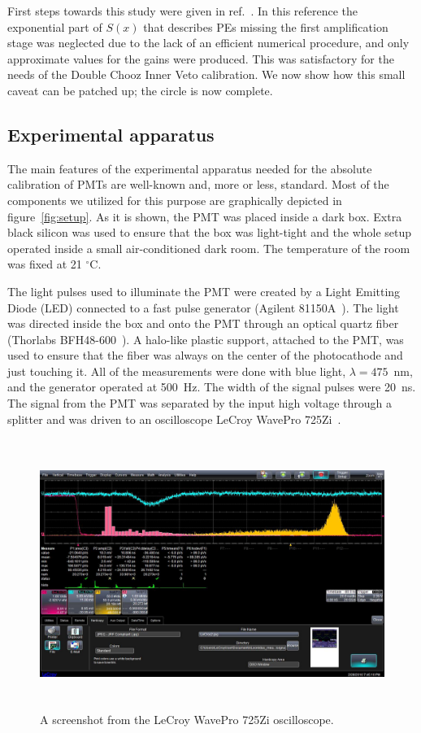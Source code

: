 \documentclass[a4paper,11pt]{article}
\begin{document}
First steps towards this study were given in ref.~\cite{Me}. 
In this reference the exponential part of $S(x)$ that describes PEs missing the first amplification stage was neglected 
due to the lack of an efficient numerical procedure, and only approximate values for the gains were produced.
This was satisfactory for the needs of the Double Chooz Inner Veto calibration. 
We now show how this small caveat can be patched up; the circle is now complete. 


\subsection{Experimental apparatus}
%

The main features of the experimental apparatus needed for the absolute calibration of PMTs are well-known and, more or less, standard.
Most of the components we utilized for this purpose are graphically depicted in figure~\ref{fig:setup}. 
As it is shown, the PMT was placed inside a dark box. 
Extra black silicon was used to ensure that the box was light-tight and the whole setup operated inside a small air-conditioned dark room. 
The temperature of the room was fixed at 21 $^\circ$C. 

The light pulses used to illuminate the PMT were created by a Light Emitting Diode (LED) connected to a fast pulse generator (Agilent 81150A~\cite{agi}). 
The light was directed inside the box and onto the PMT through an optical quartz fiber (Thorlabs BFH48-600~\cite{fib}). 
A halo-like plastic support, attached to the PMT, was used to ensure that the fiber was always on the center of the photocathode and just touching it. 
All of the measurements were done with blue light, $ \lambda = 475$~nm, and the generator operated at 500~Hz. 
The width of the signal pulses were 20~ns.  
The signal from the PMT was separated by the input high voltage through a splitter and was driven to an oscilloscope LeCroy WavePro 725Zi~\cite{lecroy}. 

\begin{figure}[!t]
\centering
\includegraphics[width=14.0cm, height=8.75cm]{figures/LeCroy2.jpg} 
\caption{A screenshot from the LeCroy WavePro 725Zi oscilloscope.}
\label{fig:lecroy}
\end{figure}
\end{document}
